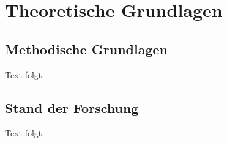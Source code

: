 \chapter{Theoretische Grundlagen}

\section{Methodische Grundlagen}
Text folgt.

\section{Stand der Forschung}
Text folgt.
